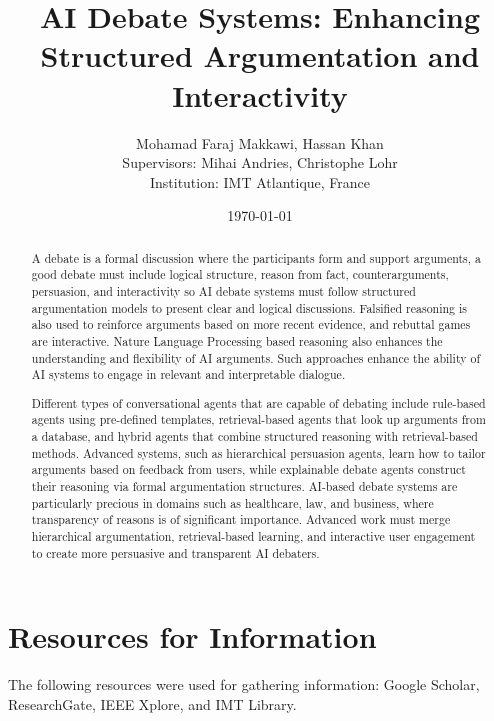 \documentclass[12pt]{article}
\title{AI Debate Systems: Enhancing Structured Argumentation and Interactivity}
\author{Mohamad Faraj Makkawi, Hassan Khan\\
    Supervisors: Mihai Andries, Christophe Lohr\\
    Institution: IMT Atlantique, France}
\date{\today}
\begin{document}
\maketitle

\begin{abstract}
    A debate is a formal discussion where the participants form and support arguments, a good debate must include logical structure, reason from fact, counterarguments, persuasion, and interactivity so AI debate systems must follow structured argumentation models to present clear and logical discussions. Falsified reasoning is also used to reinforce arguments based on more recent evidence, and rebuttal games are interactive. Nature Language Processing based reasoning also enhances the understanding and flexibility of AI arguments. Such approaches enhance the ability of AI systems to engage in relevant and interpretable dialogue.

    Different types of conversational agents that are capable of debating include rule-based agents using pre-defined templates, retrieval-based agents that look up arguments from a database, and hybrid agents that combine structured reasoning with retrieval-based methods. Advanced systems, such as hierarchical persuasion agents, learn how to tailor arguments based on feedback from users, while explainable debate agents construct their reasoning via formal argumentation structures. AI-based debate systems are particularly precious in domains such as healthcare, law, and business, where transparency of reasons is of significant importance. Advanced work must merge hierarchical argumentation, retrieval-based learning, and interactive user engagement to create more persuasive and transparent AI debaters.
\end{abstract}

\section{Resources for Information}
\begin{small}
    The following resources were used for gathering information: Google Scholar, ResearchGate, IEEE Xplore, and IMT Library.
\end{small}
\end{document}
